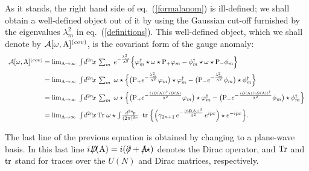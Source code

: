 \documentclass[a4paper,12pt]{article}
\def\cA{{\cal A}}
\def\A{{\rm A}}
\def\Aslash{{\A\mkern-12mu/}}
\def\Dirac{{D\mkern-12mu/}}
\def\prslash{{\partial\mkern-9mu/}}
\def\prslash{{\partial\mkern-9mu/}}    %
\def\idpn{\int\! \frac{d^{2n}\!p}{(2\pi)^{2n}} \,\,}
\def\idxn{\int\! d^{2n}\!x \,}
\begin{document}
As it stands, the right hand side of eq.~(\ref{formalanom}) is ill-defined; 
we shall obtain a well-defined object out of it by using 
the Gaussian cut-off furnished by the eigenvalues $\lambda^2_m$ in 
eq.~(\ref{definitions}). This well-defined object, which we shall denote
by $\cA[\omega,\A]^{(cov)}$, is the covariant form of the gauge anomaly:
\begin{displaymath}
\begin{array}{l}
{\cA[\omega,\A]^{(cov)}=\mbox{lim}_{\Lambda\rightarrow\infty}\;
\idxn\sum_m\;
e^{-\frac{\lambda_m^2}{\Lambda^2}}\Big\{\varphi_m^{\dagger}\star\omega\star
{\rm P}_{+}\varphi_m
-\phi_m^{\dagger}\star\omega\star
{\rm P}_{-}\phi_m\Big\}}\\[9pt]
{\phantom{\cA[\omega,\A]^{(cov)}}=
\mbox{lim}_{\Lambda\rightarrow\infty}\;
\idxn\sum_m\;\omega\star\Big\{
\big({\rm P}_{+}e^{-\frac{\lambda_m^2}{\Lambda^2}}
\varphi_m\big)\star\varphi_m^{\dagger}-
\big({\rm P}_{-}e^{-\frac{\lambda_m^2}{\Lambda^2}}
\phi_m\big)\star\phi_m^{\dagger}\Big\}}\\[9pt]
{\phantom{\cA[\omega,\A]^{(cov)}}=
\mbox{lim}_{\Lambda\rightarrow\infty}\;
\idxn\sum_m\;\omega\star\Big\{
\big({\rm P}_{+}e^{-\frac{(i\hat{D}(\A))^{\dagger}i\hat{D}(\A)}{\Lambda^2}}
\varphi_m\big)\star\varphi_m^{\dagger}-
\big({\rm P}_{-}e^{-\frac{i\hat{D}(\A)(i\hat{D}(\A))^{\dagger}}{\Lambda^2}}
\phi_m\big)\star\phi_m^{\dagger}\Big\}}\\[9pt]
{\phantom{\cA[\omega,\A]^{(cov)}}=
\mbox{lim}_{\Lambda\rightarrow\infty}\;
\idxn{\rm Tr}\;\omega\star\idpn\,{\rm tr}\;\Big\{
\Big(\gamma_{2n+1}\,e^{-\frac{(i\Dirac(\A))^2}{\Lambda^2}}\,e^{ipx}\Big)\star
e^{-ipx}\Big\}.}\\[9pt]
\end{array}
\end{displaymath}
The last line of the previous equation is obtained by changing to a plane-wave 
basis. In this last line $i\Dirac(\A)=i(\prslash+\Aslash\star)$ denotes 
the Dirac operator, and ${\rm Tr}$ and ${\rm tr}$ stand for traces over 
the $U(N)$ and Dirac matrices, respectively. 
\end{document}
